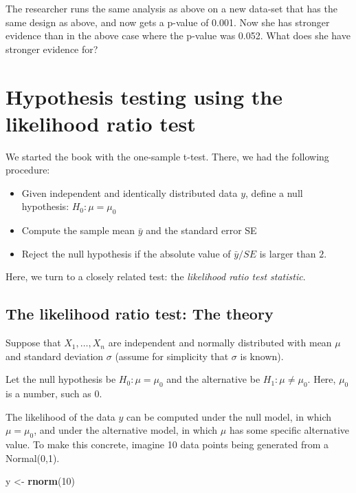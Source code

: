 \documentclass[12pt,]{krantz}
\newenvironment{Shaded}{\begin{snugshade}}{\end{snugshade}}
\newcommand{\DecValTok}[1]{\textcolor[rgb]{0.00,0.00,0.81}{#1}}
\newcommand{\KeywordTok}[1]{\textcolor[rgb]{0.13,0.29,0.53}{\textbf{#1}}}
\newcommand{\NormalTok}[1]{#1}
\newcommand{\StringTok}[1]{\textcolor[rgb]{0.31,0.60,0.02}{#1}}
\providecommand{\tightlist}{%
  \setlength{\itemsep}{0pt}\setlength{\parskip}{0pt}}
\begin{document}
The researcher runs the same analysis as above on a new data-set that has the same design as above, and now gets a p-value of 0.001. Now she has stronger evidence than in the above case where the p-value was 0.052. What does she have stronger evidence for?

\hypertarget{hypothesis-testing-using-the-likelihood-ratio-test}{%
\chapter{Hypothesis testing using the likelihood ratio test}\label{hypothesis-testing-using-the-likelihood-ratio-test}}

We started the book with the one-sample t-test. There, we had the following procedure:

\begin{itemize}
\tightlist
\item
  Given independent and identically distributed data \(y\), define a null hypothesis: \(H_0: \mu=\mu_0\)
\item
  Compute the sample mean \(\bar{y}\) and the standard error SE
\item
  Reject the null hypothesis if the absolute value of \(\bar{y}/SE\) is larger than \(2\).
\end{itemize}

Here, we turn to a closely related test: the \emph{likelihood ratio test statistic}.

\hypertarget{the-likelihood-ratio-test-the-theory}{%
\section{The likelihood ratio test: The theory}\label{the-likelihood-ratio-test-the-theory}}

Suppose that \(X_1,\dots, X_n\) are independent and normally distributed with mean \(\mu\) and standard deviation \(\sigma\) (assume for simplicity that \(\sigma\) is known).

Let the null hypothesis be \(H_0: \mu=\mu_0\) and the alternative be \(H_1: \mu\neq \mu_0\). Here, \(\mu_0\) is a number, such as \(0\).

The likelihood of the data \(y\) can be computed under the null model, in which \(\mu=\mu_0\), and under the alternative model, in which \(\mu\) has some specific alternative value. To make this concrete, imagine 10 data points being generated from a Normal(0,1).

\begin{Shaded}
\begin{Highlighting}[]
\NormalTok{y <-}\StringTok{ }\KeywordTok{rnorm}\NormalTok{(}\DecValTok{10}\NormalTok{)}
\end{Highlighting}
\end{Shaded}
\end{document}
